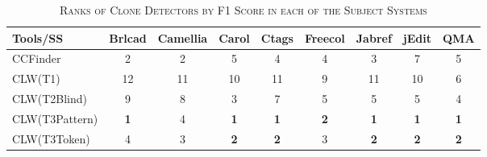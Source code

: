\documentclass[review]{elsarticle}
\begin{document}
\begin{table}[]
\caption{\textsc{Ranks of Clone Detectors by F1 Score in each of the Subject Systems}}
\label{tab:ranking-individual-ss}
\centering
\small\addtolength{\tabcolsep}{-4pt}
\begin{tabular}{lcccccccc}
\hline
\multicolumn{1}{|l|}{\textbf{Tools/SS}} & \multicolumn{1}{c|}{\textbf{Brlcad}} & \multicolumn{1}{c|}{\textbf{Camellia}} & \multicolumn{1}{c|}{\textbf{Carol}} & \multicolumn{1}{c|}{\textbf{Ctags}} & \multicolumn{1}{c|}{\textbf{Freecol}} & \multicolumn{1}{c|}{\textbf{Jabref}} & \multicolumn{1}{c|}{\textbf{jEdit}} & \multicolumn{1}{c|}{\textbf{QMA}} \\ \hline
\multicolumn{1}{|l|}{CCFinder}          & \multicolumn{1}{c|}{2}               & \multicolumn{1}{c|}{2}                 & \multicolumn{1}{c|}{5}              & \multicolumn{1}{c|}{4}              & \multicolumn{1}{c|}{4}                & \multicolumn{1}{c|}{3}               & \multicolumn{1}{c|}{7}              & \multicolumn{1}{c|}{5}            \\ \hline
\multicolumn{1}{|l|}{CLW(T1)}           & \multicolumn{1}{c|}{12}              & \multicolumn{1}{c|}{11}                & \multicolumn{1}{c|}{10}             & \multicolumn{1}{c|}{11}             & \multicolumn{1}{c|}{9}                & \multicolumn{1}{c|}{11}              & \multicolumn{1}{c|}{10}             & \multicolumn{1}{c|}{6}            \\ \hline
\multicolumn{1}{|l|}{CLW(T2Blind)}      & \multicolumn{1}{c|}{9}               & \multicolumn{1}{c|}{8}                 & \multicolumn{1}{c|}{3}              & \multicolumn{1}{c|}{7}              & \multicolumn{1}{c|}{5}                & \multicolumn{1}{c|}{5}               & \multicolumn{1}{c|}{5}              & \multicolumn{1}{c|}{4}            \\ \hline
\multicolumn{1}{|l|}{CLW(T3Pattern)}    & \multicolumn{1}{c|}{\textbf{1}}      & \multicolumn{1}{c|}{4}                 & \multicolumn{1}{c|}{\textbf{1}}     & \multicolumn{1}{c|}{\textbf{1}}     & \multicolumn{1}{c|}{\textbf{2}}       & \multicolumn{1}{c|}{\textbf{1}}      & \multicolumn{1}{c|}{\textbf{1}}     & \multicolumn{1}{c|}{\textbf{1}}   \\ \hline
\multicolumn{1}{|l|}{CLW(T3Token)}      & \multicolumn{1}{c|}{4}               & \multicolumn{1}{c|}{3}                 & \multicolumn{1}{c|}{\textbf{2}}     & \multicolumn{1}{c|}{\textbf{2}}     & \multicolumn{1}{c|}{3}                & \multicolumn{1}{c|}{\textbf{2}}      & \multicolumn{1}{c|}{\textbf{2}}     & \multicolumn{1}{c|}{\textbf{2}}   \\ \hline

\end{tabular}
\end{table}
\end{document}
